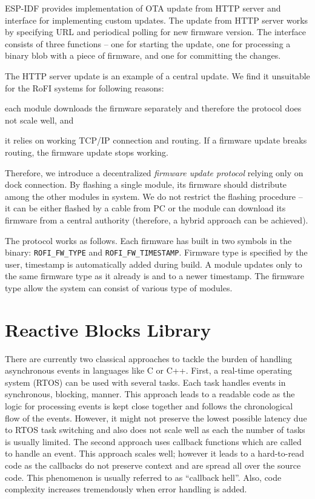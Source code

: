 ESP-IDF provides implementation of OTA update from HTTP server and interface for
implementing custom updates. The update from HTTP server works by specifying URL
and periodical polling for new firmware version. The interface consists of three
functions -- one for starting the update, one for processing a binary blob with
a piece of firmware, and one for committing the changes.

The HTTP server update is an example of a central update. We find it unsuitable
for the RoFI systems for following reasons:
\begin{enumerate*}
    \item each module downloads the firmware separately and therefore the
    protocol does not scale well, and
    \item it relies on working TCP/IP connection and routing. If a firmware
    update breaks routing, the firmware update stops working.
\end{enumerate*}
Therefore, we introduce a decentralized \emph{firmware update protocol} relying
only on dock connection. By flashing a single module, its firmware should
distribute among the other modules in system. We do not restrict the flashing
procedure -- it can be either flashed by a cable from PC or the module can
download its firmware from a central authority (therefore, a hybrid approach can
be achieved).

The protocol works as follows. Each firmware has built in two symbols in the
binary: \texttt{ROFI\_FW\_TYPE} and \texttt{ROFI\_FW\_TIMESTAMP}. Firmware type
is specified by the user, timestamp is automatically added during build. A
module updates only to the same firmware type as it already is and to a newer
timestamp. The firmware type allow the system can consist of various type of
modules.

\section{Reactive Blocks Library} \label{sec:rbl}

There are currently two classical approaches to tackle the burden of handling
asynchronous events in languages like C or C++. First, a real-time operating
system (RTOS) can be used with several tasks. Each task handles events in
synchronous, blocking, manner. This approach leads to a readable code as the
logic for processing events is kept close together and follows the chronological
flow of the events. However, it might not preserve the lowest possible latency
due to RTOS task switching and also does not scale well as each the number of
tasks is usually limited. The second approach uses callback functions which are
called to handle an event. This approach scales well; however it leads to a
hard-to-read code as the callbacks do not preserve context and are spread all
over the source code. This phenomenon is usually referred to as ``callback
hell''. Also, code complexity increases tremendously when error handling is
added.

